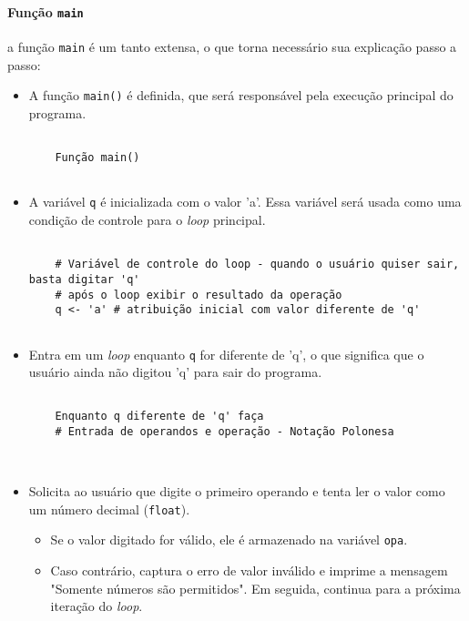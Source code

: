 \documentclass[a4paper, 12pt, onecolumn,singlespacing]{article}
\begin{document}
\paragraph{Função \texttt{main}} a função \texttt{main} é um tanto extensa, o que torna necessário sua explicação passo a passo:

\begin{itemize}
	\item A função \texttt{main()} é definida, que será responsável pela execução principal do programa.

\begin{verbatim}
		
	Função main()
	
\end{verbatim}

	\item A variável \texttt{q} é inicializada com o valor 'a'. Essa variável será usada como uma condição de controle para o \textit{loop} principal.
	
\begin{verbatim}
		
	# Variável de controle do loop - quando o usuário quiser sair, basta digitar 'q'
	# após o loop exibir o resultado da operação
	q <- 'a' # atribuição inicial com valor diferente de 'q'
	
\end{verbatim}
	
	\item Entra em um \textit{loop} enquanto \texttt{q} for diferente de 'q', o que significa que o usuário ainda não digitou 'q' para sair do programa.

\begin{verbatim}
	
	Enquanto q diferente de 'q' faça
	# Entrada de operandos e operação - Notação Polonesa

	
\end{verbatim}

	\item Solicita ao usuário que digite o primeiro operando e tenta ler o valor como um número decimal (\texttt{float}).
	\begin{itemize}
		\item Se o valor digitado for válido, ele é armazenado na variável \texttt{opa}.
		\item Caso contrário, captura o erro de valor inválido e imprime a mensagem "Somente números são permitidos". Em seguida, continua para a próxima iteração do \textit{loop}.
	\end{itemize}
\begin{verbatim}


\end{verbatim}
\end{itemize}
\end{document}
